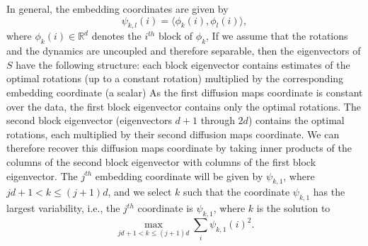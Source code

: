 \documentclass{pnastwo}
\begin{document}
\begin{article}
In general, the embedding coordinates are given by
\begin{equation} \label{eq:vdm_coord}
\psi_{k,l} (i) = \langle \phi_k(i), \phi_l(i) \rangle,
\end{equation}
where $\phi_k(i) \in \mathbb{R}^d$ denotes the $i^{th}$ block of $\phi_k$,
%
If we assume that the rotations and the dynamics are uncoupled and therefore separable, then the eigenvectors of $S$ have the following structure: each block eigenvector contains estimates of the optimal rotations (up to a constant rotation) multiplied by the corresponding embedding coordinate (a scalar)
%
As the first diffusion maps coordinate is constant over the data, the first block eigenvector contains only the optimal rotations.
%
The second block eigenvector (eigenvectors $d+1$ through $2d$) contains the optimal rotations, each multiplied by their second diffusion maps coordinate.
%
We can therefore recover this diffusion maps coordinate by taking inner products of the columns of the second block eigenvector with columns of the first block eigenvector.
The $j^{th}$ embedding coordinate will be given by $\psi_{k,1}$, where $jd +1 < k \le (j+1)d$,
and we select $k$ such that the coordinate $\psi_{k, 1}$ has the largest variability, i.e., the $j^{th}$ coordinate is $\psi_{k,1}$, where $k$ is the solution to
\begin{equation} \label{eq:first_embed_vdm}
\max_{jd +1 < k \le (j+1)d} \sum_i \psi_{k,1} (i)^2. 
\end{equation}


\end{article}
\end{document}
